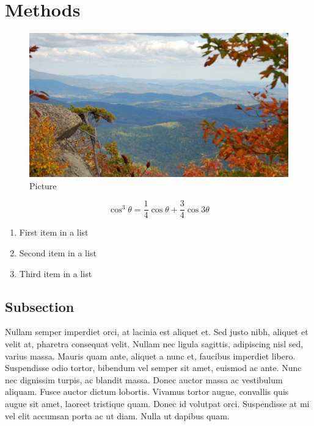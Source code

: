 \documentclass[fleqn,10pt]{JLA_article} %
\begin{document}
\hypertarget{methods}{%
\section{Methods}\label{methods}}

\begin{figure}[ht]\centering %
\includegraphics[width=\linewidth/2]{fig/view}
\caption{Picture}
\label{fig:view}
\end{figure}

\begin{equation}
\cos^3 \theta =\frac{1}{4}\cos\theta+\frac{3}{4}\cos 3\theta
\label{eq:refname2}
\end{equation}

\begin{enumerate}[noitemsep] %
\item First item in a list
\item Second item in a list
\item Third item in a list
\end{enumerate}

\hypertarget{subsection}{%
\subsection{Subsection}\label{subsection}}

Nullam semper imperdiet orci, at lacinia est aliquet et. Sed justo nibh, aliquet et velit at, pharetra consequat velit. Nullam nec ligula sagittis, adipiscing nisl sed, varius massa. Mauris quam ante, aliquet a nunc et, faucibus imperdiet libero. Suspendisse odio tortor, bibendum vel semper sit amet, euismod ac ante. Nunc nec dignissim turpis, ac blandit massa. Donec auctor massa ac vestibulum aliquam. Fusce auctor dictum lobortis. Vivamus tortor augue, convallis quis augue sit amet, laoreet tristique quam. Donec id volutpat orci. Suspendisse at mi vel elit accumsan porta ac ut diam. Nulla ut dapibus quam.
\end{document}
